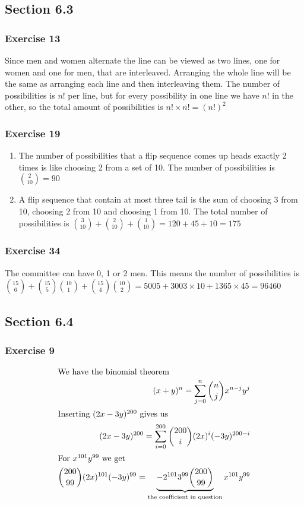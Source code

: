 \documentclass[a4paper]{article}
\newcommand{\ex}[1]{\subsubsection*{#1}}
\begin{document}
\subsection*{Section 6.3}
\ex{Exercise 13}
Since men and women alternate the line can be viewed as two lines, one for women and one for men, that are interleaved. Arranging the whole line will be the same as arranging each line and then interleaving them. The number of possibilities is \(n!\) per line, but for every possibility in one line we have \(n!\) in the other, so the total amount of possibilities is \(n!\times n! = (n!)^2\)

\ex{Exercise 19} %

\begin{enumerate}[start = 2, label=\alph*)]
    \item The number of possibilities that a flip sequence comes up heads exactly 2 times is like choosing 2 from a set of 10. The number of possibilities is \(\binom{2}{10} = 90\)

    \item A flip sequence that contain at most three tail is the sum of choosing 3 from 10, choosing 2 from 10 and choosing 1 from 10. The total number of possibilities is \(\binom{3}{10} + \binom{2}{10} + \binom{1}{10} = 120 + 45 + 10 = 175\)
\end{enumerate}

\ex{Exercise 34}
The committee can have 0, 1 or 2 men. 
This means the number of possibilities is \(\binom{15}{6} + \binom{15}{5}\binom{10}{1} + \binom{15}{4}\binom{10}{2} = 5005 + 3003\times 10 + 1365\times 45 = 96460\)


\subsection*{Section 6.4}
\ex{Exercise 9}
\begin{align}
    \intertext{We have the binomial theorem}
    (x+y)^n = \sum_{j=0}^n{\binom{n}{j}x^{n-j}y^j} \\
    \intertext{Inserting \((2x-3y)^{200}\) gives us}
    (2x-3y)^{200} = \sum_{i=0}^{200}\binom{200}{i}(2x)^i(-3y)^{200-i} \\
    \intertext{For \(x^{101}y^{99}\) we get}
    \binom{200}{99}(2x)^{101}(-3y)^{99} = \underbrace{-2^{101}3^{99}\binom{200}{99}}_{\text{the coefficient in question}}x^{101}y^{99} \\
\end{align}

%
\end{document}

